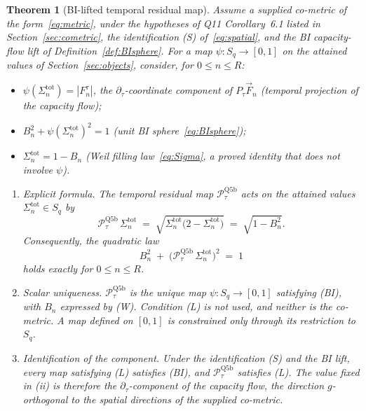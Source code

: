\documentclass[11pt,a4paper]{article}
\newtheorem{theorem}{Theorem}[section]
\begin{document}
      \begin{theorem}[BI-lifted temporal residual map]\label{thm:main}
        Assume a supplied co-metric of the form~\eqref{eq:metric}, under the hypotheses of Q11 Corollary~6.1
        listed in Section~\ref{sec:cometric}, the identification \textup{(S)} of~\eqref{eq:spatial},
        and the BI capacity-flow lift of Definition~\ref{def:BIsphere}.
        For a map $\psi\colon S_q \to [0,1]$ on the attained values of Section~\ref{sec:objects}, consider, for
        $0 \le n \le R$:
        \begin{itemize}
          \item[\textup{(L)}] $\psi(\Sigma_n^{\mathrm{tot}}) = |F_n^\tau|$, the $\partial_\tau$-coordinate component
          of $P_\tau \vec{F}_n$ (temporal projection of the capacity flow);
          \item[\textup{(BI)}] $B_n^2 + \psi(\Sigma_n^{\mathrm{tot}})^2 = 1$
          (unit BI sphere~\eqref{eq:BIsphere});
          \item[\textup{(W)}] $\Sigma_n^{\mathrm{tot}} = 1 - B_n$ (Weil filling law~\eqref{eq:Sigma}, a proved
          identity that does not involve $\psi$).
        \end{itemize}
        \begin{enumerate}
          \item[\textup{(i)}] \emph{Explicit formula.}
          The temporal residual map $\mathcal{P}_\tau^{\mathrm{Q5b}}$ acts on the attained values
          $\Sigma_n^{\mathrm{tot}} \in S_q$ by
          \begin{equation}\label{eq:Ptau-scalar}
            \mathcal{P}_\tau^{\mathrm{Q5b}}\,\Sigma_n^{\mathrm{tot}}
            \;=\; \sqrt{\Sigma_n^{\mathrm{tot}}\bigl(2-\Sigma_n^{\mathrm{tot}}\bigr)}
            \;=\; \sqrt{1-B_n^2}.
          \end{equation}
          Consequently, the quadratic law
          \begin{equation}\label{eq:quadratic}
            B_n^2 \;+\; \bigl(\mathcal{P}_\tau^{\mathrm{Q5b}}\,\Sigma_n^{\mathrm{tot}}\bigr)^2 \;=\; 1
          \end{equation}
          holds exactly for $0 \le n \le R$.
          \item[\textup{(ii)}] \emph{Scalar uniqueness.}
          $\mathcal{P}_\tau^{\mathrm{Q5b}}$ is the unique map $\psi\colon S_q \to [0,1]$ satisfying \textup{(BI)},
          with $B_n$ expressed by \textup{(W)}.
          Condition \textup{(L)} is not used, and neither is the co-metric.
          A map defined on $[0,1]$ is constrained only through its restriction to $S_q$.
          \item[\textup{(iii)}] \emph{Identification of the component.}
          Under the identification \textup{(S)} and the BI lift, every map satisfying \textup{(L)} satisfies
          \textup{(BI)}, and $\mathcal{P}_\tau^{\mathrm{Q5b}}$ satisfies \textup{(L)}.
          The value fixed in \textup{(ii)} is therefore the $\partial_\tau$-component of the capacity flow, the
          direction $g$-orthogonal to the spatial directions of the supplied co-metric.
        \end{enumerate}
      \end{theorem}
\end{document}
